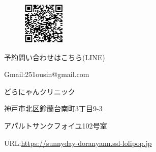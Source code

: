 \documentclass{jsarticle}
\begin{document}
	\vspace{100pt}
	\begin{figure}
		\vspace*{-\intextsep}
		\hspace{-60pt}
		\includegraphics[width=2cm]{qr.jpg}
	\end{figure}
	予約問い合わせはこちら(LINE)

	Gmail:251ousin@gmail.com

	\vspace{50pt}
	どらにゃんクリニック

	神戸市北区鈴蘭台南町3丁目9-3

	アパルトサンクフォイユ102号室

	URL:\url{https://sunnyday-doranyann.ssl-lolipop.jp}
\end{document}

